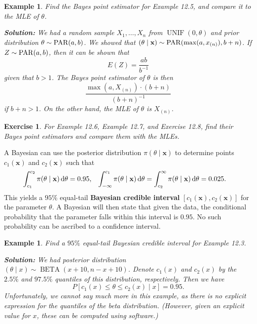 \documentclass[10pt]{article}
\newcommand{\dd}{\,{\rm d}}
\DeclareMathOperator{\UNIF}{UNIF}
\DeclareMathOperator{\BETA}{BETA}
\theoremstyle{newstyle}
\newtheorem{exercise}[thm]{Exercise}
\newtheorem{exmp}[thm]{Example}
\begin{document}
\begin{exmp}
Find the Bayes point estimator for Example 12.5, and compare it to the MLE of $\theta$. 

{\color{blue}
{\bf Solution:}
We had a random sample $X_1, \dots, X_n$ from $\UNIF(0, \theta)$ and prior distribution 
$\theta \sim {\rm PAR}(a, b)$. We showed that $(\theta \mid \mathbf x) \sim 
{\rm PAR}(\max(a, x_{(n)}), b+n)$. If $Z \sim {\rm PAR}(a, b)$, then it can be shown that 
\[ E(Z) = \frac{ab}{b^{-1}} \]
given that $b > 1$. The Bayes point estimator of $\theta$ is then 
\[ \frac{\max(a, X_{(n)}) \cdot (b+n)}{(b+n)^{-1}} \]
if $b+n > 1$. On the other hand, the MLE of $\theta$ is $X_{(n)}$.}
\end{exmp}

\begin{exercise}
For Example 12.6, Example 12.7, and Exercise 12.8, find their Bayes point estimators and compare 
them with the MLEs. 
\end{exercise}

A Bayesian can use the posterior distribution $\pi(\theta \mid \mathbf x)$ to determine 
points $c_1(\mathbf x)$ and $c_2(\mathbf x)$ such that 
\begin{align*} \int_{c_1}^{c_2} \pi(\theta \mid \mathbf x)\dd\theta &= 0.95, 
& \int_{-\infty}^{c_1} \pi(\theta \mid \mathbf x)\dd\theta &= 
\int_{c_2}^\infty \pi(\theta \mid \mathbf x)\dd\theta = 0.025. \end{align*}
This yields a $95\%$ equal-tail {\bf Bayesian credible interval} $[c_1(\mathbf x), c_2(\mathbf x)]$ 
for the parameter $\theta$. A Bayesian will then state that given the data, the conditional probability
that the parameter falls within this interval is $0.95$. No such probability can be ascribed to a 
confidence interval. 

\begin{exmp}
Find a $95\%$ equal-tail Bayesian credible interval for Example 12.3.

{\color{blue}
{\bf Solution:}
We had posterior distribution $(\theta \mid x) \sim \BETA(x+10, n-x+10)$. Denote
$c_1(x)$ and $c_2(x)$ by the $2.5\%$ and $97.5\%$ quantiles of this distribution, respectively. 
Then we have 
\[ P[c_1(x) \leq \theta \leq c_2(x) \mid x] = 0.95. \]
Unfortunately, we cannot say much more in this example, as there is no explicit expression 
for the quantiles of the beta distribution. (However, given an explicit value for $x$, 
these can be computed using software.)}
\end{exmp}
\end{document}
